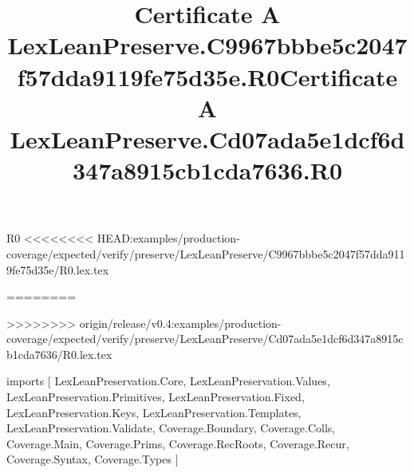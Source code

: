 \begin{lexlean}{R0}
<<<<<<<< HEAD:examples/production-coverage/expected/verify/preserve/LexLeanPreserve/C9967bbbe5c2047f57dda9119fe75d35e/R0.lex.tex
\title{Certificate A LexLeanPreserve.C9967bbbe5c2047f57dda9119fe75d35e.R0}
========
\title{Certificate A LexLeanPreserve.Cd07ada5e1dcf6d347a8915cb1cda7636.R0}
>>>>>>>> origin/release/v0.4:examples/production-coverage/expected/verify/preserve/LexLeanPreserve/Cd07ada5e1dcf6d347a8915cb1cda7636/R0.lex.tex
\begin{coremodule}
imports [
  LexLeanPreservation.Core,
  LexLeanPreservation.Values,
  LexLeanPreservation.Primitives,
  LexLeanPreservation.Fixed,
  LexLeanPreservation.Keys,
  LexLeanPreservation.Templates,
  LexLeanPreservation.Validate,
  Coverage.Boundary,
  Coverage.Colls,
  Coverage.Main,
  Coverage.Prims,
  Coverage.RecRoots,
  Coverage.Recur,
  Coverage.Syntax,
  Coverage.Types
]


\end{coremodule}
\end{lexlean}
